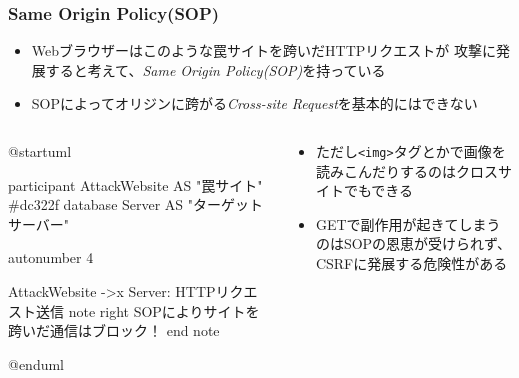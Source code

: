 \begin{frame}[fragile]
  \frametitle{Same Origin Policy(SOP)}

  \pause
  \begin{itemize}
    \item Webブラウザーはこのような罠サイトを跨いだHTTPリクエストが
    攻撃に発展すると考えて、\emph{Same Origin Policy(SOP)}を持っている
   
    \item SOPによってオリジンに跨がる\emph{Cross-site Request}を基本的にはできない
  \end{itemize}

  \begin{columns}
    \begin{column}{.5\textwidth}
      \begin{minipage}{.9\textwidth}
        \begin{plantuml}
          @startuml
          
          participant AttackWebsite AS "罠サイト" #dc322f
          database Server AS "ターゲットサーバー"
       
          autonumber 4
          
          AttackWebsite ->x Server: HTTPリクエスト送信
          note right
            SOPによりサイトを
            跨いだ通信はブロック！
          end note
       
          @enduml
        \end{plantuml}
      \end{minipage}
    \end{column}
    \begin{column}{.5\textwidth}        
      \begin{itemize}
        \item ただし\lstinline|<img>|タグとかで画像を読みこんだりするのはクロスサイトでもできる
       
        \item GETで副作用が起きてしまうのはSOPの恩恵が受けられず、
        CSRFに発展する危険性がある
      \end{itemize}
    \end{column}
  \end{columns}
  
  \pause
\end{frame}

